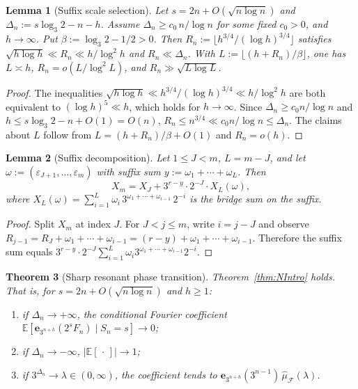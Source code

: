 \documentclass[11pt,a4paper]{amsart}
\theoremstyle{plain}
\newtheorem{theorem}{Theorem}[section]
\newtheorem{lemma}[theorem]{Lemma}
\theoremstyle{definition}
\newcommand{\E}{\mathbb{E}}
\begin{document}
\begin{lemma}[Suffix scale selection]\label{lem:suffix-scale-selection}
Let $s=2n+O(\sqrt{n\log n})$ and $\Delta_n:=s\log_3 2-n-h$.
Assume $\Delta_n\ge c_0\,n/\log n$ for some fixed $c_0>0$, and $h\to\infty$.
Put
$\beta:=\log_3 2-1/2>0$.
Then $R_n:=\lfloor h^{3/4}/(\log h)^{3/4}\rfloor$ satisfies
$\sqrt{h\log h}\ll R_n\ll h/\log^2 h$ and $R_n\ll\Delta_n$.
With $L:=\lfloor(h+R_n)/\beta\rfloor$, one has $L\asymp h$,
$R_n=o(L/\log^2 L)$, and $R_n\gg\sqrt{L\log L}$.
\end{lemma}

\begin{proof}
The inequalities $\sqrt{h\log h}\ll h^{3/4}/(\log h)^{3/4}\ll h/\log^2 h$
are both equivalent to $(\log h)^5\ll h$, which holds for $h\to\infty$.
Since $\Delta_n\ge c_0 n/\log n$ and $h\le s\log_3 2-n+O(1)=O(n)$,
$R_n\le n^{3/4}\ll c_0 n/\log n\le\Delta_n$.
The claims about $L$ follow from $L=(h+R_n)/\beta+O(1)$ and $R_n=o(h)$.
\end{proof}

\begin{lemma}[Suffix decomposition]\label{lem:suffix}
Let $1\le J<m$, $L=m-J$, and let
$\omega:=(\varepsilon_{J+1},\dots,\varepsilon_m)$ with suffix sum
$y:=\omega_1+\cdots+\omega_L$.
Then
$$
X_m=X_J+3^{r-y}\cdot 2^{-J}\cdot X_L(\omega),
$$
where $X_L(\omega)=\sum_{i=1}^L\omega_i\,3^{\omega_1+\cdots+\omega_{i-1}}\,2^{-i}$
is the bridge sum on the suffix.
\end{lemma}

\begin{proof}
Split $X_m$ at index $J$.
For $J<j\le m$, write $i=j-J$ and observe
$R_{j-1}=R_J+\omega_1+\cdots+\omega_{i-1}=(r-y)+\omega_1+\cdots+\omega_{i-1}$.
Therefore the suffix sum equals $3^{r-y}\cdot 2^{-J}\sum_{i=1}^L\omega_i 3^{\omega_1+\cdots+\omega_{i-1}}2^{-i}$.
\end{proof}

\begin{theorem}[Sharp resonant phase transition]\label{thm:N}
Theorem~\ref{thm:NIntro} holds.
That is, for $s=2n+O(\sqrt{n\log n})$ and $h\ge1$:
\begin{enumerate}[label=\textup{(\arabic*)}]
\item if $\Delta_n\to+\infty$, the conditional Fourier coefficient
$\E[\mathbf e_{3^{n+h}}(2^s F_n)\mid S_n=s]\to0$;
\item if $\Delta_n\to-\infty$, $|\E[\,\cdot\,]|\to1$;
\item if $3^{\Delta_n}\to\lambda\in(0,\infty)$, the coefficient tends
to $\mathbf e_{3^{n+h}}(3^{n-1})\,\widehat\mu_{\mathcal F}(\lambda)$.
\end{enumerate}
\end{theorem}
\end{document}
